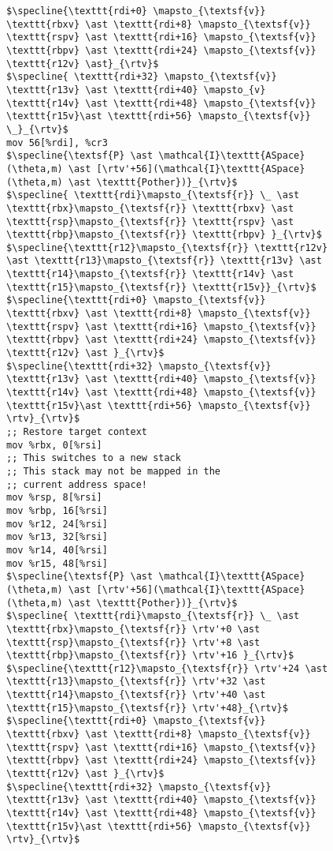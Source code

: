 \begin{figure}
\begin{lstlisting}
$\specline{\texttt{rdi+0} \mapsto_{\textsf{v}} \texttt{rbxv} \ast \texttt{rdi+8} \mapsto_{\textsf{v}} \texttt{rspv} \ast \texttt{rdi+16} \mapsto_{\textsf{v}} \texttt{rbpv} \ast \texttt{rdi+24} \mapsto_{\textsf{v}} \texttt{r12v} \ast}_{\rtv}$
$\specline{ \texttt{rdi+32} \mapsto_{\textsf{v}} \texttt{r13v} \ast \texttt{rdi+40} \mapsto_{v} \texttt{r14v} \ast \texttt{rdi+48} \mapsto_{\textsf{v}} \texttt{r15v}\ast \texttt{rdi+56} \mapsto_{\textsf{v}} \_}_{\rtv}$
mov 56[%rdi], %cr3
$\specline{\textsf{P} \ast \mathcal{I}\texttt{ASpace}(\theta,m) \ast [\rtv'+56](\mathcal{I}\texttt{ASpace}(\theta,m) \ast \texttt{Pother})}_{\rtv}$
$\specline{ \texttt{rdi}\mapsto_{\textsf{r}} \_ \ast \texttt{rbx}\mapsto_{\textsf{r}} \texttt{rbxv} \ast  \texttt{rsp}\mapsto_{\textsf{r}} \texttt{rspv} \ast \texttt{rbp}\mapsto_{\textsf{r}} \texttt{rbpv} }_{\rtv}$
$\specline{\texttt{r12}\mapsto_{\textsf{r}} \texttt{r12v} \ast \texttt{r13}\mapsto_{\textsf{r}} \texttt{r13v} \ast \texttt{r14}\mapsto_{\textsf{r}} \texttt{r14v} \ast \texttt{r15}\mapsto_{\textsf{r}} \texttt{r15v}}_{\rtv}$
$\specline{\texttt{rdi+0} \mapsto_{\textsf{v}} \texttt{rbxv} \ast \texttt{rdi+8} \mapsto_{\textsf{v}} \texttt{rspv} \ast \texttt{rdi+16} \mapsto_{\textsf{v}} \texttt{rbpv} \ast \texttt{rdi+24} \mapsto_{\textsf{v}} \texttt{r12v} \ast }_{\rtv}$
$\specline{\texttt{rdi+32} \mapsto_{\textsf{v}} \texttt{r13v} \ast \texttt{rdi+40} \mapsto_{\textsf{v}} \texttt{r14v} \ast \texttt{rdi+48} \mapsto_{\textsf{v}} \texttt{r15v}\ast \texttt{rdi+56} \mapsto_{\textsf{v}} \rtv}_{\rtv}$    
;; Restore target context
mov %rbx, 0[%rsi] 
;; This switches to a new stack
;; This stack may not be mapped in the
;; current address space!
mov %rsp, 8[%rsi] 
mov %rbp, 16[%rsi]
mov %r12, 24[%rsi]
mov %r13, 32[%rsi]
mov %r14, 40[%rsi]
mov %r15, 48[%rsi]
$\specline{\textsf{P} \ast \mathcal{I}\texttt{ASpace}(\theta,m) \ast [\rtv'+56](\mathcal{I}\texttt{ASpace}(\theta,m) \ast \texttt{Pother})}_{\rtv}$
$\specline{ \texttt{rdi}\mapsto_{\textsf{r}} \_ \ast \texttt{rbx}\mapsto_{\textsf{r}} \rtv'+0 \ast  \texttt{rsp}\mapsto_{\textsf{r}} \rtv'+8 \ast \texttt{rbp}\mapsto_{\textsf{r}} \rtv'+16 }_{\rtv}$
$\specline{\texttt{r12}\mapsto_{\textsf{r}} \rtv'+24 \ast \texttt{r13}\mapsto_{\textsf{r}} \rtv'+32 \ast \texttt{r14}\mapsto_{\textsf{r}} \rtv'+40 \ast \texttt{r15}\mapsto_{\textsf{r}} \rtv'+48}_{\rtv}$
$\specline{\texttt{rdi+0} \mapsto_{\textsf{v}} \texttt{rbxv} \ast \texttt{rdi+8} \mapsto_{\textsf{v}} \texttt{rspv} \ast \texttt{rdi+16} \mapsto_{\textsf{v}} \texttt{rbpv} \ast \texttt{rdi+24} \mapsto_{\textsf{v}} \texttt{r12v} \ast }_{\rtv}$
$\specline{\texttt{rdi+32} \mapsto_{\textsf{v}} \texttt{r13v} \ast \texttt{rdi+40} \mapsto_{\textsf{v}} \texttt{r14v} \ast \texttt{rdi+48} \mapsto_{\textsf{v}} \texttt{r15v}\ast \texttt{rdi+56} \mapsto_{\textsf{v}} \rtv}_{\rtv}$

\end{lstlisting}
\end{figure}
